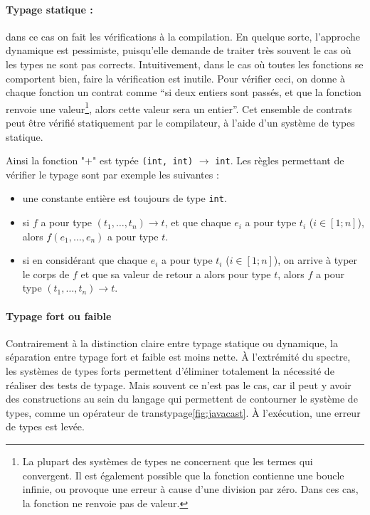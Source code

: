 \paragraph{Typage statique :} dans ce cas on fait les vérifications à la
compilation. En quelque sorte, l'approche dynamique est pessimiste, puisqu'elle
demande de traiter très souvent le cas où les types ne sont pas corrects.
Intuitivement, dans le cas où toutes les fonctions se comportent bien, faire la
vérification est inutile. Pour vérifier ceci, on donne à chaque fonction un
contrat comme ``si deux entiers sont passés, et que la fonction renvoie une
valeur\footnote{
  La plupart des systèmes de types ne concernent que les termes qui convergent.
  Il est également possible que la fonction contienne une boucle infinie, ou
  provoque une erreur à cause d'une division par zéro. Dans ces cas, la fonction
  ne renvoie pas de valeur.
}, alors cette valeur sera un entier''. Cet ensemble de contrats peut être vérifié statiquement
par le compilateur, à l'aide d'un système de types statique.

Ainsi la fonction "$+$" est typée \texttt{(int, int)} $→$ \texttt{int}. Les
règles permettant de vérifier le typage sont par exemple les suivantes :

\begin{itemize}
\item
  une constante entière est toujours de type \texttt{int}.
\item
  si $f$ a pour type $(t_1, …, t_n) → t$, et que chaque $e_i$ a pour type $t_i$
  ($i ∈ [1;n]$), alors $f(e_1, …, e_n)$ a pour type $t$.
\item
  si en considérant que chaque $e_i$ a pour type $t_i$ ($i ∈ [1;n]$),
  on arrive à typer le corps de $f$ et que sa valeur de retour a alors
  pour type $t$,
  alors $f$ a pour type $(t_1, …, t_n) → t$.
\end{itemize}

\paragraph{Typage fort ou faible}

Contrairement à la distinction claire entre typage statique ou dynamique, la
séparation entre typage fort et faible est moins nette. À l'extrémité du
spectre, les systèmes de types forts permettent d'éliminer totalement la
nécessité de réaliser des tests de typage. Mais souvent ce n'est pas le cas, car
il peut y avoir des constructions au sein du langage qui permettent de
contourner le système de types, comme un opérateur de
transtypage\ref{fig:javacast}. À l'exécution, une erreur de types est levée.

